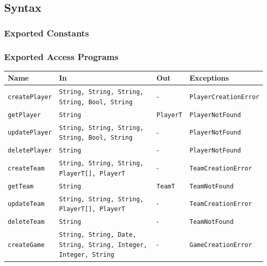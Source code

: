 \documentclass[12pt, titlepage]{article}
\begin{document}
\subsection{Syntax}

\subsubsection{Exported Constants}

\subsubsection{Exported Access Programs}

\begin{center}
  \begin{tabular}{p{4cm} p{4cm} p{4cm} p{4cm}}
    \toprule
    \textbf{Name} & \textbf{In} & \textbf{Out} & \textbf{Exceptions} \\
    \midrule
    \texttt{createPlayer}         & \texttt{String, String, String, String, Bool, String}                   & -            & \texttt{PlayerCreationError} \\
    \texttt{getPlayer}            & \texttt{String}                                                         & \texttt{PlayerT}      & \texttt{PlayerNotFound}      \\
    \texttt{updatePlayer}         & \texttt{String, String, String, String, Bool, String}                   & -            & \texttt{PlayerNotFound}      \\
    \texttt{deletePlayer}         & \texttt{String}                                                         & -            & \texttt{PlayerNotFound}      \\
    \texttt{createTeam}           & \texttt{String, String, String, PlayerT[], PlayerT}                     & -            & \texttt{TeamCreationError}   \\
    \texttt{getTeam}              & \texttt{String}                                                         & \texttt{TeamT}        & \texttt{TeamNotFound}        \\
    \texttt{updateTeam}           & \texttt{String, String, String, PlayerT[], PlayerT}                     & -            & \texttt{TeamCreationError}   \\
    \texttt{deleteTeam}           & \texttt{String}                                                         & -            & \texttt{TeamNotFound}        \\
    \texttt{createGame}           & \texttt{String, String, Date, String, String, Integer, Integer, String} & -            & \texttt{GameCreationError}   \\

\end{tabular}
\end{center}
\end{document}
